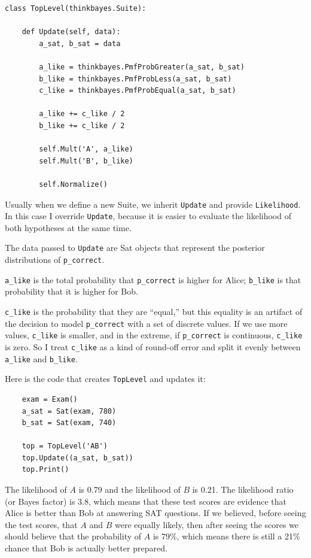 \documentclass[12pt]{book}
\begin{document}
\begin{verbatim}
class TopLevel(thinkbayes.Suite):

    def Update(self, data):
        a_sat, b_sat = data

        a_like = thinkbayes.PmfProbGreater(a_sat, b_sat)
        b_like = thinkbayes.PmfProbLess(a_sat, b_sat)
        c_like = thinkbayes.PmfProbEqual(a_sat, b_sat)

        a_like += c_like / 2
        b_like += c_like / 2

        self.Mult('A', a_like)
        self.Mult('B', b_like)

        self.Normalize()
\end{verbatim}

Usually when we define a new Suite, we inherit {\tt Update}
and provide {\tt Likelihood}.  In this case I override {\tt Update},
because it is easier to evaluate the likelihood of both
hypotheses at the same time.

The data passed to {\tt Update} are Sat objects that represent
the posterior distributions of \verb"p_correct".

\verb"a_like" is the total probability that
\verb"p_correct" is higher for Alice; \verb"b_like" is that
probability that it is higher for Bob.

\verb"c_like" is the probability that they are ``equal,'' but this
equality is an artifact of the decision to model \verb"p_correct" with
a set of discrete values.  If we use more values, \verb"c_like"
is smaller, and in the extreme, if \verb"p_correct" is
continuous, \verb"c_like" is zero.  So I treat \verb"c_like" as
a kind of round-off error and split it evenly between \verb"a_like"
and \verb"b_like".

Here is the code that creates {\tt TopLevel} and updates it:

\begin{verbatim}
    exam = Exam()
    a_sat = Sat(exam, 780)
    b_sat = Sat(exam, 740)

    top = TopLevel('AB')
    top.Update((a_sat, b_sat))
    top.Print()
\end{verbatim}

The likelihood of $A$ is 0.79 and the likelihood of $B$ is 0.21.  The
likelihood ratio (or Bayes factor) is 3.8, which means that these test
scores are evidence that Alice is better than Bob at answering SAT
questions.  If we believed, before seeing the test scores, that $A$
and $B$ were equally likely, then after seeing the scores we should
believe that the probability of $A$ is 79\%, which means there is
still a 21\% chance that Bob is actually better prepared.
\end{document}
